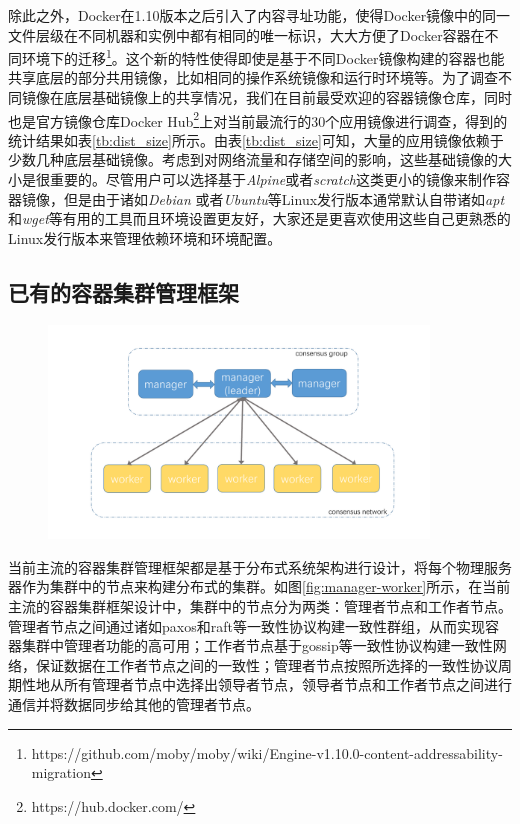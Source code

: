 除此之外，Docker在1.10版本之后引入了内容寻址功能，使得Docker镜像中的同一文件层级在不同机器和实例中都有相同的唯一标识，大大方便了Docker容器在不同环境下的迁移\footnote{https://github.com/moby/moby/wiki/Engine-v1.10.0-content-addressability-migration}。这个新的特性使得即使是基于不同Docker镜像构建的容器也能共享底层的部分共用镜像，比如相同的操作系统镜像和运行时环境等。为了调查不同镜像在底层基础镜像上的共享情况，我们在目前最受欢迎的容器镜像仓库，同时也是官方镜像仓库Docker Hub\footnote{https://hub.docker.com/}上对当前最流行的30个应用镜像进行调查，得到的统计结果如表\ref{tb:dist_size}所示。由表\ref{tb:dist_size}可知，大量的应用镜像依赖于少数几种底层基础镜像。考虑到对网络流量和存储空间的影响，这些基础镜像的大小是很重要的。尽管用户可以选择基于\emph{Alpine}或者\emph{scratch}这类更小的镜像来制作容器镜像，但是由于诸如\emph{Debian} 或者\emph{Ubuntu}等Linux发行版本通常默认自带诸如\emph{apt}和\emph{wget}等有用的工具而且环境设置更友好，大家还是更喜欢使用这些自己更熟悉的Linux发行版本来管理依赖环境和环境配置。

\subsection{已有的容器集群管理框架}
\begin{figure}[htbp]
\centering
\includegraphics[width=0.9\textwidth]{./figure/manager-worker}
\end{figure}
当前主流的容器集群管理框架都是基于分布式系统架构进行设计，将每个物理服务器作为集群中的节点来构建分布式的集群。如图\ref{fig:manager-worker}所示，在当前主流的容器集群框架设计中，集群中的节点分为两类：管理者节点和工作者节点。管理者节点之间通过诸如paxos和raft等一致性协议构建一致性群组，从而实现容器集群中管理者功能的高可用；工作者节点基于gossip等一致性协议构建一致性网络，保证数据在工作者节点之间的一致性；管理者节点按照所选择的一致性协议周期性地从所有管理者节点中选择出领导者节点，领导者节点和工作者节点之间进行通信并将数据同步给其他的管理者节点。

